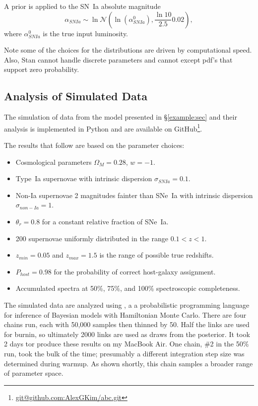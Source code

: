\documentclass[preprint]{aastex}
\begin{document}
A prior is applied to the SN~Ia absolute magnitude
\begin{equation}
\alpha_{SNIa} \sim \ln\mathcal{N}\left(\ln\left(\alpha^0_{SNIa}\right),\frac{\ln{10}}{2.5}0.02\right),
\end{equation}
where $\alpha^0_{SNIa}$ is the true input luminosity.

Note some of the choices for the distributions are driven by computational
speed. 
Also, Stan cannot handle discrete parameters and
cannot except pdf's that support zero probability.

\subsection{Analysis of Simulated Data}
The simulation of data from the model presented in \S\ref{example:sec}
and their analysis is implemented in Python and are available
on GitHub\footnote{\url{git@github.com:AlexGKim/abc.git}}.

The results that follow are based on the parameter
choices:
\begin{itemize}
\item Cosmological parameters $\Omega_M=0.28$, $w=-1$.
\item Type~Ia supernovae with intrinsic dispersion $\sigma_{SNIa}=0.1$.
\item Non-Ia supernovae 2 magnitudes fainter than SNe~Ia with intrinsic
dispersion $\sigma_{non-Ia}=1$.
\item $\theta_r=0.8$ for a constant relative fraction of SNe~Ia.
\item 200 supernovae uniformly distributed in the range $0.1<z<1$.
\item $z_{min}=0.05$ and $z_{max}=1.5$ is the range of possible true redshifts.
\item $P_{host}=0.98$ for the probability of correct host-galaxy assignment.
\item Accumulated spectra at 50\%, 75\%, and 100\% spectroscopic
completeness.
\end{itemize}

The simulated data are analyzed using 
\citet{stan-software:2015}, a
a probabilistic programming language for
inference of Bayesian models with Hamiltonian Monte Carlo.  There are
four chains run, each with 50,000 samples then thinned by 50.  Half the links
are used for burnin, so ultimately 2000 links are used as draws from the posterior.
It took 2 days tor produce these results on my MacBook Air.  One chain, \#2
in the 50\% run,  took the bulk of the time; presumably a different integration step size
was determined during warmup.  As shown shortly, this chain samples
a broader range of parameter space.
\end{document}

